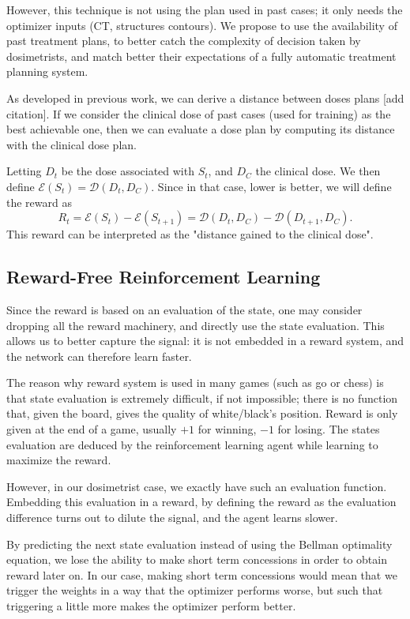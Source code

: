 However, this technique is not using the plan used in past cases; it only needs the optimizer inputs (CT, structures contours).
We propose to use the availability of past treatment plans, to better catch the complexity of decision taken by dosimetrists, and match better their expectations of a fully automatic treatment planning system.

As developed in previous work, we can derive a distance between doses plans [add citation].
If we consider the clinical dose of past cases (used for training) as the best achievable one, then we can evaluate a dose plan by computing its distance with the clinical dose plan.

Letting $D_t$ be the dose associated with $S_t$, and $D_C$ the clinical dose.
We then define $\mathcal{E}(S_t) = \mathcal{D}(D_t, D_C)$.
Since in that case, lower is better, we will define the reward as $$R_t = \mathcal{E}(S_t) - \mathcal{E}(S_{t+1}) = \mathcal{D}(D_t, D_C) - \mathcal{D}(D_{t+1}, D_C).$$
This reward can be interpreted as the "distance gained to the clinical dose".


\subsection{Reward-Free Reinforcement Learning}

Since the reward is based on an evaluation of the state, one may consider dropping all the reward machinery, and directly use the state evaluation.
This allows us to better capture the signal: it is not embedded in a reward system, and the network can therefore learn faster.

The reason why reward system is used in many games (such as go or chess) is that state evaluation is extremely difficult, if not impossible; there is no function that, given the board, gives the quality of white/black's position.
Reward is only given at the end of a game, usually $+1$ for winning, $-1$ for losing.
The states evaluation are deduced by the reinforcement learning agent while learning to maximize the reward.

However, in our dosimetrist case, we exactly have such an evaluation function.
Embedding this evaluation in a reward, by defining the reward as the evaluation difference turns out to dilute the signal, and the agent learns slower.

By predicting the next state evaluation instead of using the Bellman optimality equation, we lose the ability to make short term concessions in order to obtain reward later on.
In our case, making short term concessions would mean that we trigger the weights in a way that the optimizer performs worse, but such that triggering a little more makes the optimizer perform better.

